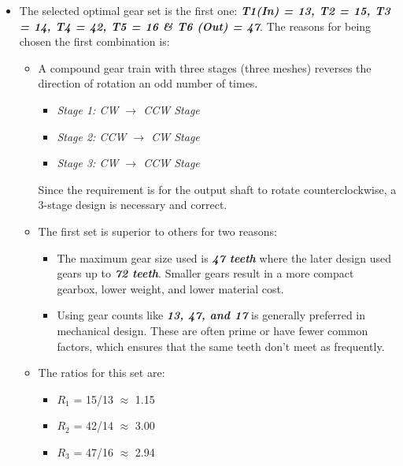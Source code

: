 \documentclass[12pt]{article}
\begin{document}
\begin{itemize}
    \item [(d)] The selected optimal gear set is the first one: \textit{\textbf{T1(In) = 13, T2 = 15, T3 = 14, T4 = 42, T5 = 16 \& T6 (Out) = 47}}. The reasons for being chosen the first combination is:

          \begin{itemize}

              \item [(1)] A compound gear train with three stages (three meshes) reverses the direction of rotation an odd number of times.

                    \begin{itemize}
                        \item [(a)] \textit{Stage 1: CW $\rightarrow$ CCW Stage}
                        \item [(b)] \textit{Stage 2: CCW $\rightarrow$ CW Stage}
                        \item [(c)] \textit{Stage 3: CW $\rightarrow$ CCW Stage}
                    \end{itemize}

                    Since the requirement is for the output shaft to rotate counterclockwise, a 3-stage design is necessary and correct.

              \item [(2)] The first set is superior to others for two reasons:

                    \begin{itemize}

                        \item [(a)] The maximum gear size used is \textit{\textbf{47 teeth}} where the later design used gears up to \textit{\textbf{72 teeth}}. Smaller gears result in a more compact gearbox, lower weight, and lower material cost.

                        \item [(b)] Using gear counts like \textit{\textbf{13, 47, and 17}} is generally preferred in mechanical design. These are often prime or have fewer common factors, which ensures that the same teeth don't meet as frequently.

                    \end{itemize}

              \item [(3)] The ratios for this set are:

                    \begin{itemize}
                        \item [(a)] $R_1$ = 15/13 $\approx$ 1.15
                        \item [(b)] $R_2$ = 42/14 $\approx$ 3.00
                        \item [(c)] $R_3$ = 47/16 $\approx$ 2.94
                    \end{itemize}


\end{itemize}
\end{itemize}
\end{document}
